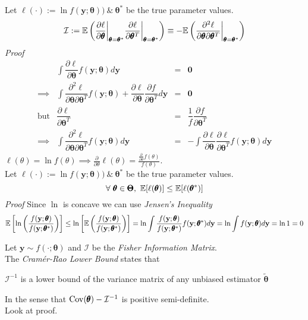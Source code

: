 \documentclass[11pt,a4paper]{article}
\begin{document}
Let $\ell(\cdot):=\ln f(\textbf{y};\pmb\theta))\ \&\ \pmb\theta^*$ be the true parameter values.
$$\mathcal{I}:=\mathbb{E}\left(\dfrac{\partial\ell}{\partial\pmb\theta}\bigg|_{\pmb\theta=\pmb\theta^*}\dfrac{\partial\ell}{\partial\pmb\theta^T}\bigg|_{\pmb\theta=\pmb\theta^*}\right)\equiv-\mathbb{E}\left(\dfrac{\partial^2\ell}{\partial\pmb\theta\partial\pmb\theta^T}\bigg|_{\pmb\theta=\pmb\theta^*}\right)$$
\textit{Proof}
\[\begin{array}{rrcl}
&\displaystyle\int\dfrac{\partial\ell}{\partial\pmb\theta}f(\textbf{y};\pmb\theta)d\textbf{y}&=&\pmb0\\
\implies&\displaystyle\int\dfrac{\partial^2\ell}{\partial\pmb\theta\partial\pmb\theta^T}f(\textbf{y};\pmb\theta)+\dfrac{\partial\ell}{\partial\pmb\theta}\dfrac{\partial f}{\partial\pmb\theta^T}d\textbf{y}&=&\pmb0\\
\text{but}&\dfrac{\partial\ell}{\partial\pmb\theta^T}&=&\dfrac1f\dfrac{\partial f}{\partial\pmb\theta^T}\\
\implies&\displaystyle\int\dfrac{\partial^2\ell}{\partial\pmb\theta\partial\pmb\theta^T}f(\textbf{y};\pmb\theta)d\textbf{y}&=&-\displaystyle\int\dfrac{\partial\ell}{\partial\pmb\theta}\dfrac{\partial\ell}{\partial\pmb\theta^T}f(\textbf{y};\pmb\theta)d\textbf{y}
\end{array}\]
\proved
\nb $\ell(\theta)=\ln f(\theta)\implies\frac{\partial}{\partial\theta}\ell(\theta)=\frac{\frac\partial{\partial\theta}f(\theta)}{f(\theta)}$.\\

Let $\ell(\cdot):=\ln f(\textbf{y};\pmb\theta))\ \&\ \pmb\theta^*$ be the true parameter values.
$$\forall\ \pmb\theta\in\pmb\Theta,\ \expect[\ell(\pmb\theta)]\leq\expect[\ell(\pmb\theta^*)]$$
\textit{Proof}
Since $\ln$ is concave we can use \textit{Jensen's Inequality}
$$\mathbb{E}\left[\ln\left(\dfrac{f(\textbf{y};\pmb\theta)}{f(\textbf{y};\pmb\theta^*)}\right)\right]\leq\ln\left[\mathbb{E}\left(\dfrac{f(\textbf{y};\pmb\theta)}{f(\textbf{y};\pmb\theta^*)}\right)\right]=\ln\int\dfrac{f(\textbf{y};\pmb\theta)}{f(\textbf{y};\pmb\theta^*)}f(\textbf{y};\pmb\theta^*)d\textbf{y}=\ln\int f(\textbf{y};\pmb\theta)d\textbf{y}=\ln1=0$$
\proved

Let $\textbf{y}\sim f(\cdot;\pmb\theta)$ and $\mathcal{I}$ be the \textit{Fisher Information Matrix}.\\
The \textit{Cram\'er-Rao Lower Bound} states that
\begin{center}$\mathcal{I}^{-1}$ is a lower bound of the variance matrix of any unbiased estimator $\tilde{\pmb\theta}$ \end{center}
In the sense that $\mathrm{Cov}(\pmb\theta)-\mathcal{I}^{-1}$ is positive semi-definite.\\
\nb Look at proof.\\
\end{document}
